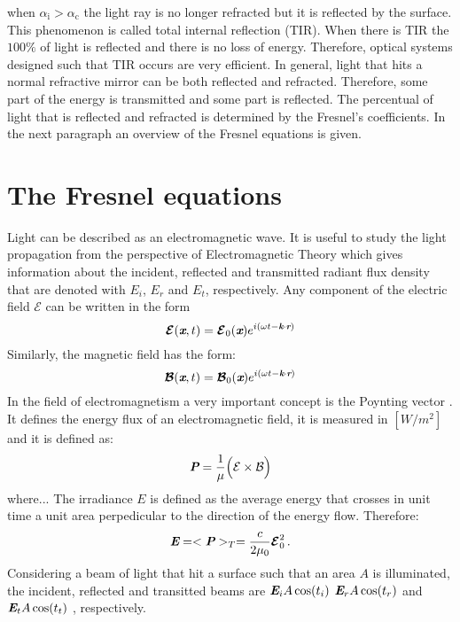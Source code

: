 when $\alpha_{\textrm{i}}>\alpha_{\textrm{c}}$ the light ray is no longer refracted but it is reflected by the surface. This phenomenon is called total internal reflection (TIR). When there is TIR the $100\%$ of light is reflected and there is no loss of energy. Therefore, optical systems designed such that TIR occurs are very efficient. In general, light that hits a normal refractive mirror can be both reflected and refracted. Therefore, some part of the energy is transmitted and some part is reflected. The percentual of light that is reflected and refracted is determined by the Fresnel's coefficients.
In the next paragraph an overview of the Fresnel equations is given.

\section{The Fresnel equations}
Light can be described as an electromagnetic wave.
It is useful to study the light propagation from the perspective of Electromagnetic Theory which gives information about the incident, reflected and transmitted radiant flux density that are denoted with $E_i$, $E_r$ and $E_t$, respectively.  
Any component of the electric field $\mathcal{E}$ can be written in the form
\begin{equation}
\boldsymbol{\mathcal{E}}(\textit{\textbf{x}}, t) = \boldsymbol{\mathcal{E}}_0(\textit{\textbf{x}} )e^{i(\omega t - \textit{\textbf{k}}\cdot \textit{\textbf{r}})}
\end{equation}
Similarly, the magnetic field has the form:
\begin{equation}
\boldsymbol{\mathcal{B}}(\textit{\textbf{x}}, t) = \boldsymbol{\mathcal{B}}_0(\textit{\textbf{x}}) e^{i(\omega t - \textit{\textbf{k}}\cdot \textit{\textbf{r}})}
\end{equation}
In the field of electromagnetism a very important concept is the Poynting vector . 
It defines the energy flux of an electromagnetic field,  it is measured in $[W/m^2]$ and it is defined as:
\begin{equation}
\textit{\textbf{P}} = \frac{1}{\mu}\Big(\mathcal{E}\times \mathcal{B}\Big)
\end{equation}
where... 
The irradiance $E$ is defined as the average energy that crosses in unit time a unit area perpedicular to the direction of the energy flow.
Therefore:
\begin{equation}
\textit{\textbf{E}} = <\textit{\textbf{P}}>_{T} = \frac{c}{2\mu_0}\boldsymbol{\mathcal{E}}_0^2\,.
\end{equation}
Considering a beam of light that hit a surface such that an area $A$ is illuminated, the incident, reflected and transitted beams are $\textit{\textbf{E}}_i A\cos(t_i)$ $\textit{\textbf{E}}_r A\cos(t_r)$ and $\textit{\textbf{E}}_t A\cos(t_t)$ , respectively.
